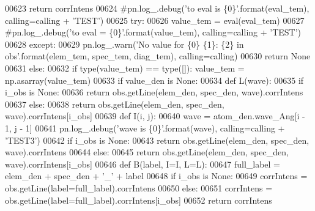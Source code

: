 \begin{DoxyCode}
{{{{00623                 \textcolor{keywordflow}{return} corrIntens
00624             \textcolor{comment}{#pn.log\_.debug('to eval is \{0\}'.format(eval\_tem), calling=calling + 'TEST')}
00625             \textcolor{keywordflow}{try}:
00626                 value\_tem = eval(eval\_tem)
00627                 \textcolor{comment}{#pn.log\_.debug('to eval = \{0\}'.format(value\_tem), calling=calling + 'TEST')}
00628             \textcolor{keywordflow}{except}:
00629                 pn.log\_.warn(\textcolor{stringliteral}{'No value for \{0\} \{1\}: \{2\} in obs'}.format(elem\_tem, spec\_tem, diag\_tem), 
      calling=calling)
00630                 \textcolor{keywordflow}{return} \textcolor{keywordtype}{None}
00631         \textcolor{keywordflow}{else}:
00632             \textcolor{keywordflow}{if} type(value\_tem) == type([]): value\_tem = np.asarray(value\_tem)
00633         \textcolor{keywordflow}{if} value\_den \textcolor{keywordflow}{is} \textcolor{keywordtype}{None}:
00634             \textcolor{keyword}{def }L(wave): 
00635                 \textcolor{keywordflow}{if} i\_obs \textcolor{keywordflow}{is} \textcolor{keywordtype}{None}:
00636                     \textcolor{keywordflow}{return} obs.getLine(elem\_den, spec\_den, wave).corrIntens
00637                 \textcolor{keywordflow}{else}:
00638                     \textcolor{keywordflow}{return} obs.getLine(elem\_den, spec\_den, wave).corrIntens[i\_obs]
00639             \textcolor{keyword}{def }I(i, j):
00640                 wave = atom\_den.wave\_Ang[i - 1, j - 1]
00641                 pn.log\_.debug(\textcolor{stringliteral}{'wave is \{0\}'}.format(wave), calling=calling + \textcolor{stringliteral}{'TEST3'})
00642                 \textcolor{keywordflow}{if} i\_obs \textcolor{keywordflow}{is} \textcolor{keywordtype}{None}:
00643                     \textcolor{keywordflow}{return} obs.getLine(elem\_den, spec\_den, wave).corrIntens
00644                 \textcolor{keywordflow}{else}:
00645                     \textcolor{keywordflow}{return} obs.getLine(elem\_den, spec\_den, wave).corrIntens[i\_obs]
00646             \textcolor{keyword}{def }B(label, I=I, L=L):
00647                 full\_label = elem\_den + spec\_den + \textcolor{stringliteral}{'\_'} + label
00648                 \textcolor{keywordflow}{if} i\_obs \textcolor{keywordflow}{is} \textcolor{keywordtype}{None}:
00649                     corrIntens = obs.getLine(label=full\_label).corrIntens
00650                 \textcolor{keywordflow}{else}:
00651                     corrIntens = obs.getLine(label=full\_label).corrIntens[i\_obs]
00652                 \textcolor{keywordflow}{return} corrIntens
}}}}
\end{DoxyCode}
